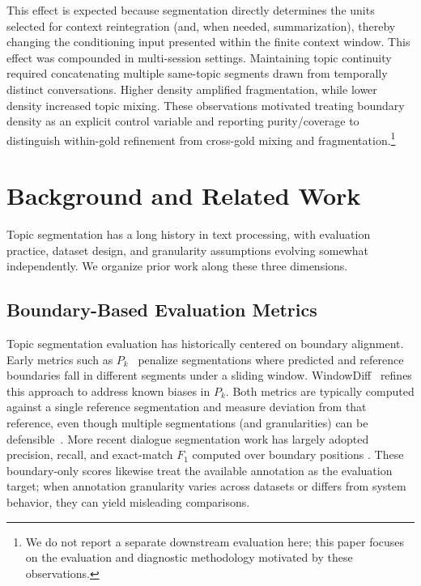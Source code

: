 \documentclass{article}
\begin{document}
This effect is expected because segmentation directly determines the
units selected for context reintegration (and, when needed,
summarization), thereby changing the conditioning input presented
within the finite context window. This effect was compounded in
multi-session settings. Maintaining topic continuity required
concatenating multiple same-topic segments drawn from temporally
distinct conversations. Higher density amplified fragmentation, while
lower density increased topic mixing.  These observations motivated
treating boundary density as an explicit control variable and
reporting purity/coverage to distinguish within-gold refinement from
cross-gold mixing and fragmentation.\footnote{We do not report a
separate downstream evaluation here; this paper focuses on the
evaluation and diagnostic methodology motivated by these
observations.}

\section{Background and Related Work}

Topic segmentation has a long history in text processing, with
evaluation practice, dataset design, and granularity assumptions
evolving somewhat independently. We organize prior work along these
three dimensions.

\subsection{Boundary-Based Evaluation Metrics}
Topic segmentation evaluation has historically centered on boundary
alignment. Early metrics such as $P_k$~\cite{beeferman1999statistical} penalize
segmentations where predicted and reference boundaries fall in different
segments under a sliding window. WindowDiff~\cite{pevzner2002critique} refines
this approach to address known biases in $P_k$. Both metrics are typically
computed against a single reference segmentation and measure deviation from
that reference, even though multiple segmentations (and granularities) can be
defensible~\citep{fournier-inkpen-2012-segmentation,fournier-2013-evaluating}.
More recent dialogue segmentation work has largely adopted precision, recall,
and exact-match $F_1$ computed over boundary positions \citep{jiang2023superdialseg,xia2022dialogue}.
These boundary-only scores likewise treat the available annotation as the
evaluation target; when annotation granularity varies across datasets or differs
from system behavior, they can yield misleading comparisons.
\end{document}
